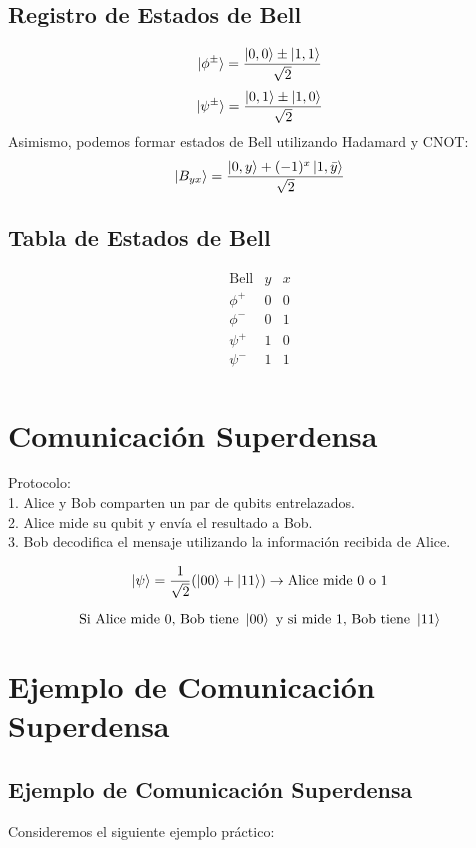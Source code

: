 \documentclass[a4paper,12pt]{article}
\begin{document}
\subsection{Registro de Estados de Bell}
\[
\ket{\phi^{\pm}} = \frac{\ket{0,0} \pm \ket{1,1}}{\sqrt{2}}
\]
\[
\ket{\psi^{\pm}} = \frac{\ket{0,1} \pm \ket{1,0}}{\sqrt{2}}
\]
Asimismo, podemos formar estados de Bell utilizando Hadamard y CNOT:
\[
\ket{B_{yx}} = \frac{\ket{0,y} + (-1)^x \ket{1,\bar{y}}}{\sqrt{2}}
\]

\subsection{Tabla de Estados de Bell}
\[
\begin{array}{c|c|c}
\text{Bell} & y & x \\ \hline
\phi^{+} & 0 & 0 \\
\phi^{-} & 0 & 1 \\
\psi^{+} & 1 & 0 \\
\psi^{-} & 1 & 1 \\
\end{array}
\]

\section{Comunicación Superdensa}

Protocolo: \\
1. Alice y Bob comparten un par de qubits entrelazados. \\
2. Alice mide su qubit y envía el resultado a Bob. \\
3. Bob decodifica el mensaje utilizando la información recibida de Alice.

\[
\ket{\psi} = \frac{1}{\sqrt{2}}(\ket{00} + \ket{11}) \rightarrow \text{Alice mide } 0 \text{ o } 1
\]

\[
\text{Si Alice mide } 0 \text{, Bob tiene } \ket{00} \text{ y si mide } 1 \text{, Bob tiene } \ket{11}
\]

\section{Ejemplo de Comunicación Superdensa}
\subsection{Ejemplo de Comunicación Superdensa}
Consideremos el siguiente ejemplo práctico:
\end{document}
